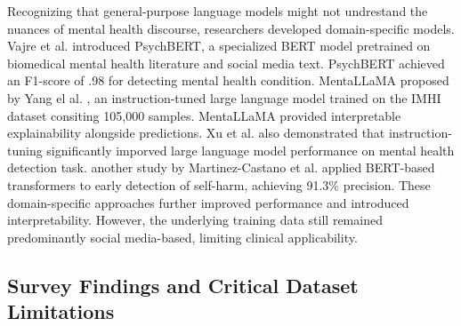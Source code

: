 \documentclass{article}
\begin{document}


Recognizing that general-purpose language models might not undrestand the nuances of mental health discourse, researchers developed domain-specific models. Vajre et al. \cite{vajre2021psychbert} introduced PsychBERT, a specialized BERT model pretrained on biomedical mental health literature and social media text. PsychBERT achieved an F1-score of .98 for detecting mental health condition. MentaLLaMA proposed by Yang el al. \cite{yang2024mentallama}, an instruction-tuned large language model trained on the IMHI dataset consiting 105,000 samples. MentaLLaMA provided interpretable explainability alongside predictions. Xu et al.\cite{xu2024mental} also demonstrated that instruction-tuning significantly imporved large language model performance on mental health detection task. another study by Martinez-Castano et al.\cite{martinez2022early} applied BERT-based transformers to early detection of self-harm, achieving 91.3\% precision. These domain-specific approaches further improved performance and  introduced interpretability. However, the underlying training data still remained predominantly social media-based, limiting clinical applicability.
























\subsection{Survey Findings and Critical Dataset Limitations}

\end{document}
